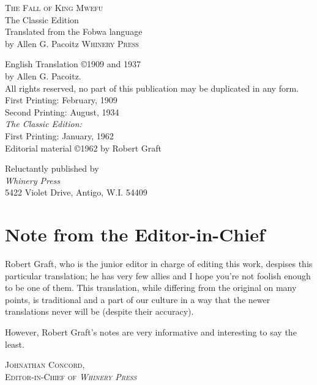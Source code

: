 \documentclass[openany, twoside, 12pt, extrafontsizes]{memoir}
\begin{document}
\frontmatter

\pagestyle{empty}

\begin{center}
\textsc{\LARGE The Fall of King Mwefu}\\
\large The Classic Edition\\[1.5cm]
Translated from the Fo\-bwa language\\ by Allen G. Pacoitz
\null\vfill
\textsc{Whinery Press}
\end{center}

\break
\null

\break
\null\vfill
\small
{
\noindent
English Translation \copyright 1909 and 1937\\by Allen G. Pacoitz.\\[0.3cm]
All rights reserved, no part of this publication may be duplicated in any form.\\[1.5cm]

\noindent
First Printing: February, 1909\\
Second Printing: August, 1934\\[0.5cm]

\noindent
\emph{The Classic Edition:} \\
First Printing: January, 1962\\
Editorial material \copyright 1962 by Robert Graft\\[2cm]
}

\noindent
Reluctantly published by\\
\emph{Whinery Press} \\
5422 Violet Drive, Antigo, W.I. 54409

\pagestyle{plain}

\chapter*{Note from the Editor-in-Chief}
Robert Graft, who is the junior editor in charge of editing this work, despises this particular translation; he has very few allies and I hope you're not foolish enough to be one of them. This translation, while differing from the original on many points, is traditional and a part of our culture in a way that the newer translations never will be (despite their accuracy).

However, Robert Graft's notes are very informative and interesting to say the least.
\begin{flushright}
\textsc{
Johnathan Concord,\\
Editor-in-Chief of \emph{Whinery Press}}
\clearpage
\end{flushright}
\end{document}
